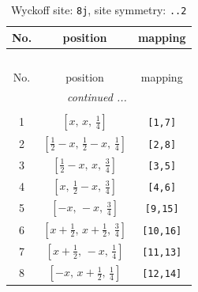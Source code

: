 \documentclass[fleqn,8pt]{jsarticle}
\begin{document}
\begin{longtable}{ccc}
\caption{Wyckoff site: {\tt 8j}, site symmetry: {\tt ..2}}
 \\
 \hline \hline
No. & position & mapping \\ \hline \endfirsthead

\multicolumn{2}{l}{\tablename\ \thetable{}} \\
 \hline \hline
No. & position & mapping \\ \hline \endhead

 \hline \hline
\multicolumn{2}{r}{\footnotesize\it continued ...} \\ \endfoot

 \hline \hline
\multicolumn{2}{r}{} \\ \endlastfoot

1 & $\left[ x,\, x,\, \frac{1}{4} \right]$ & {\tt [1,7]} \\ \hline
2 & $\left[ \frac{1}{2} - x,\, \frac{1}{2} - x,\, \frac{1}{4} \right]$ & {\tt [2,8]} \\ \hline
3 & $\left[ \frac{1}{2} - x,\, x,\, \frac{3}{4} \right]$ & {\tt [3,5]} \\ \hline
4 & $\left[ x,\, \frac{1}{2} - x,\, \frac{3}{4} \right]$ & {\tt [4,6]} \\ \hline
5 & $\left[ - x,\, - x,\, \frac{3}{4} \right]$ & {\tt [9,15]} \\ \hline
6 & $\left[ x + \frac{1}{2},\, x + \frac{1}{2},\, \frac{3}{4} \right]$ & {\tt [10,16]} \\ \hline
7 & $\left[ x + \frac{1}{2},\, - x,\, \frac{1}{4} \right]$ & {\tt [11,13]} \\ \hline
8 & $\left[ - x,\, x + \frac{1}{2},\, \frac{1}{4} \right]$ & {\tt [12,14]} \\
\end{longtable}
\renewcommand{\arraystretch}{1.2}
\end{document}
